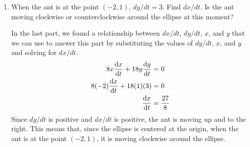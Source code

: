 \documentclass{article}
\begin{document}
\begin{enumerate}
\begin{enumerate}
    \begin{solution}
        Since we know $dy/dt$ and want to find $dx/dt$, we can take the relationship between $x$ and $y$ and differentiate both sides with respect to $t$.
        \begin{align*}
            \diff*{(4x^2+9y^2)}{t} &= \diff*{25}{t} \\
            8x\diff{x}{t} + 18y\diff{y}{t} &= 0\\
        \intertext{This gives us a relationship between $dx/dt$ and $dy/dt$. We can substitute the values we have for $x$, $y$, and $dy/dt$ to solve for $dx/dt$.}
            8(2)\diff{x}{t} + 18(1)(\tfrac{1}{3}) &= 0 \\
            \diff{x}{t} &= -\frac{3}{8}
        \end{align*}
        Since $dy/dt$ is positive and $dx/dt$ is negative, the ant is moving up and to the left. This means that, since the ellipse is centered at the origin, when the ant is at the point $(2,1)$, it is moving counterclockwise around the ellipse.
    \end{solution}

        \item
    \begin{problem}
        When the ant is at the point $(-2,1)$, $dy/dt=3$. Find $dx/dt$. Is the ant moving clockwise or counterclockwise around the ellipse at this moment?
    \end{problem}
    \pspace{\vfill}

    \begin{solution}
        In the last part, we found a relationship between $dx/dt$, $dy/dt$, $x$, and $y$ that we can use to answer this part by substituting the values of $dy/dt$, $x$, and $y$ and solving for $dx/dt$.
        \begin{align*}
            8x\diff{x}{t} + 18y\diff{y}{t} &= 0\\
            8(-2)\diff{x}{t} + 18(1)(3) &= 0\\
            \diff{x}{t} &= \frac{27}{8}
        \end{align*}
        Since $dy/dt$ is positive and $dx/dt$ is positive, the ant is moving up and to the right. This means that, since the ellipse is centered at the origin, when the ant is at the point $(-2,1)$, it is moving clockwise around the ellipse.
    \end{solution}
\end{enumerate}

\pspace{\newpage}


\end{enumerate}
\end{document}
